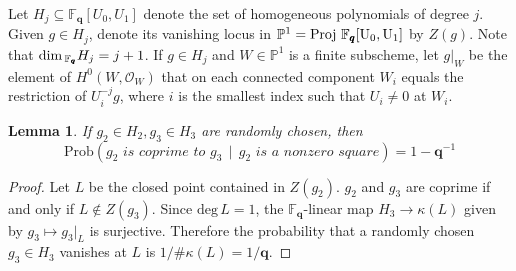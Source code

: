 \documentclass[12pt]{article}
\theoremstyle{plain}
\newtheorem{lemma}[equation]{Lemma}
\theoremstyle{definition}
\newcommand{\IF}{\mathbb{F}}
\newcommand{\IP}{\mathbb{P}}
\newcommand{\sO}{\mathcal{O}}
\renewcommand{\deg}{\mathrm{deg}\,}
\newcommand{\Proj}{\rm Proj\,}
\renewcommand\dim{{\rm dim\,}}
\newcommand{\<}{\langle}
\renewcommand{\>}{\rangle}
\newcommand{\Prob}{\mathrm{Prob}}
\begin{document}
Let $H_j \subseteq \IF_{\pmb{q}}[U_0, U_1]$ denote the set of homogeneous polynomials of degree $j$. Given $g \in H_j$, denote its vanishing locus in $\IP^1 = \Proj \, \IF_{\pmb{q}}[U_0, U_1]$ by $Z(g)$. Note that $\dim_{\IF_{\pmb{q}}} H_j = j + 1$. If $g \in H_j$ and $W \in \IP^1$ is a finite subscheme, let $g|_W$ be the
element of $H^0(W, \sO_W)$ that on each connected component $W_i$ equals the restriction of $U_i^{-j} g$, where $i$ is the smallest index such that $U_i \neq 0$ at $W_i$. 
\begin{lemma} 
\label{square}
If $g_2 \in H_2, g_3 \in H_3$ are randomly chosen, then
$$ \Prob( g_2 \textit{ is coprime to } g_3 \, \mid \, g_2 \textit{ is a nonzero square}) =  1 - \pmb{q}^{-1}$$ 
\end{lemma}
\begin{proof}
Let $L$ be the closed point contained in $Z(g_2)$. $g_2$ and $g_3$ are coprime if and only if $L \not\in Z(g_3)$. Since $\deg L = 1$, the $\IF_{\pmb{q}}$-linear map $H_3 \to \kappa(L)$ given by $g_3 \mapsto g_3|_{L}$ is surjective. Therefore the probability that a randomly chosen $g_3 \in H_3$ vanishes at $L$ is $1/ \# \kappa(L) = 1/\pmb{q}$. 
\end{proof}
\end{document}
